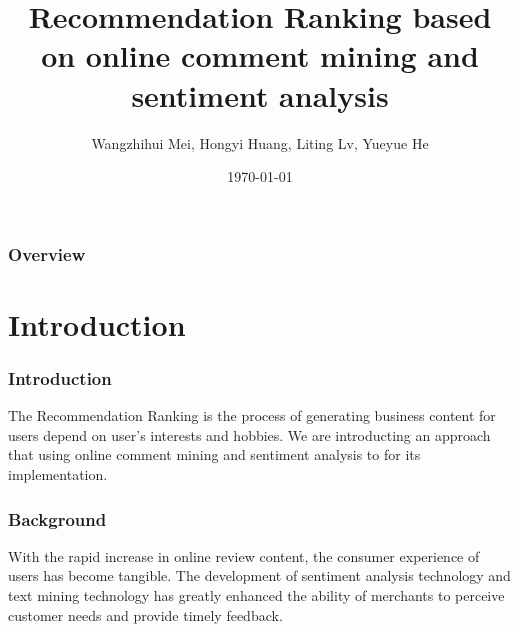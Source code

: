 \documentclass{beamer}
\title[GAI based on ML]{Recommendation Ranking based on online comment mining and sentiment analysis} %
\author{ Wangzhihui Mei, Hongyi Huang, Liting Lv, Yueyue He} %
\institute[JI] %
{
CCNU-UOW JI \\ %
\medskip
\textit{maywzh@gmail.com} %
}
\date{\today} %
\begin{document}
\begin{frame}
    \titlepage %
\end{frame}

\begin{frame}
    \frametitle{Overview} %
    \tableofcontents %
\end{frame}


\section{Introduction} %

\begin{frame}
    \frametitle{Introduction}
    The Recommendation Ranking is the process of generating business content for users depend on user's interests and hobbies. We are introducting an approach that using online comment mining and sentiment analysis to for its implementation.
\end{frame}

\begin{frame}
    \frametitle{Background}
    With the rapid increase in online review content, the consumer experience of users has become tangible. The development of sentiment analysis technology and text mining technology has greatly enhanced the ability of merchants to perceive customer needs and provide timely feedback.
\end{frame}
\end{document}

